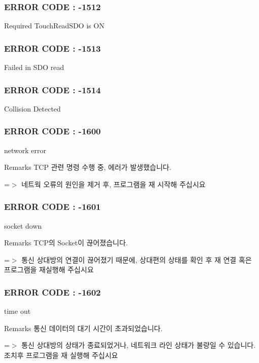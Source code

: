  \subsubsection*{E\-R\-R\-O\-R C\-O\-D\-E \-: -\/1512 }

Required Touch\-Read\-S\-D\-O is O\-N



 \subsubsection*{E\-R\-R\-O\-R C\-O\-D\-E \-: -\/1513 }

Failed in S\-D\-O read



 \subsubsection*{E\-R\-R\-O\-R C\-O\-D\-E \-: -\/1514 }

Collision Detected



 \subsubsection*{E\-R\-R\-O\-R C\-O\-D\-E \-: -\/1600 }

network error \begin{DoxyRemark}{Remarks}
T\-C\-P 관련 명령 수행 중, 에러가 발생했습니다. \par
 =$>$ 네트웍 오류의 원인을 제거 후, 프로그램을 재 시작해 주십시요
\end{DoxyRemark}


 \subsubsection*{E\-R\-R\-O\-R C\-O\-D\-E \-: -\/1601 }

socket down \begin{DoxyRemark}{Remarks}
T\-C\-P의 Socket이 끊어졌습니다. \par
 =$>$ 통신 상대방의 연결이 끊어졌기 때문에, 상대편의 상태를 확인 후 재 연결 혹은 프로그램을 재실행해 주십시요
\end{DoxyRemark}


 \subsubsection*{E\-R\-R\-O\-R C\-O\-D\-E \-: -\/1602 }

time out \begin{DoxyRemark}{Remarks}
통신 데이터의 대기 시간이 초과되었습니다. \par
 =$>$ 통신 상대방의 상태가 종료되었거나, 네트워크 라인 상태가 불량일 수 있습니다.\-조치후 프로그램을 재 실행해 주십시요
\end{DoxyRemark}



